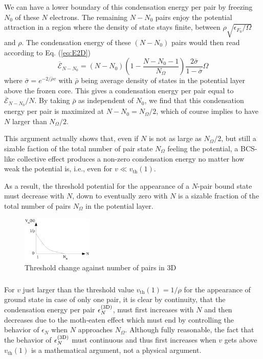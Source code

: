 \documentclass[aps,prb,showpacs,reprint]{revtex4-1}
\begin{document}
We can have a lower boundary of this condensation energy per pair by freezing $N_0$ of these $N$ electrons.  The remaining $N-N_0$ pairs enjoy the potential attraction in a region where the density of state stays finite, between $\rho\sqrt{\epsilon_{F_0}/\Omega}$ and $\rho$.  The condensation energy of these $(N-N_0)$ pairs would then read according to Eq. (\ref{eq:E2D})
\begin{equation}\label{eq:E2D}
 \overline{\mathcal{E}}_{N-N_0}=(N-N_0)(1-\frac{N-N_0-1}{N_\Omega})\frac{2\bar\sigma}{1-\bar\sigma}\Omega
\end{equation}
where $\bar{\sigma}=e^{-2/{\bar{\rho}v}}$ with $\bar\rho$ being average density of states in the potential layer above the frozen core. This gives a condensation energy per pair equal to $\overline{\mathcal{E}}_{N-N_0}/N$.  By taking $\bar\rho$ as independent of $N_0$, we find that this condensation energy per pair is maximized at $N-N_0=N_\Omega/2$, which of course implies to have $N$ larger than $N_\Omega/2$.

This argument actually shows that, even if $N$ is not as large as $N_\Omega/2$, but still a sizable faction of the total number of pair state $N_\Omega$ feeling the potential,  a BCS-like collective effect  produces a non-zero condensation energy no matter how weak the potential is, i.e., even for $v\ll{}v_\text{th}(1)$. 

As a result, the threshold potential for the appearance of a $N$-pair bound state must decrease with $N$, down to eventually zero with $N$ is a sizable fraction of the total number of pairs $N_\Omega$ in the potential layer. 

\begin{figure}[htb]
	\centering
		\includegraphics[width=0.30\textwidth]{3dThresholdChange.eps}
	\caption{Threshold change against number of pairs in 3D}
	\label{fig:3dThresholdChange}
\end{figure}

\subsubsection{}
For $v$ just larger than the threshold value $v_{\text{th}}(1)=1/\rho$ for the appearance of ground state in case of only one pair, it is clear by continuity, that the condensation energy per pair $\epsilon^{{\text{(3D)}}}_N$, must first increases with $N$ and then decreases due to the moth-eaten effect which must end by controlling the behavior of $\epsilon_N$ when $N$ approaches $N_\Omega$.  Although fully reasonable, the fact that the behavior of $\epsilon^{{\text{(3D)}}}_N$ must continuous and thus first increases when $v$ gets above $v_{\text{th}}(1)$ is a mathematical argument, not a physical argument. 
\end{document}
